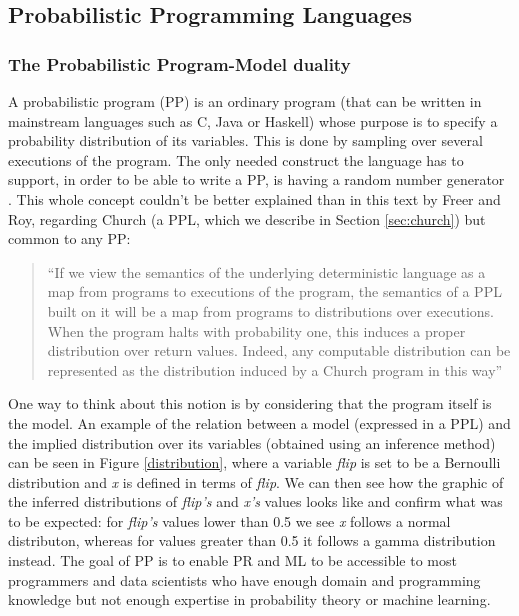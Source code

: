 \begin{itemsize}
\subsection{Probabilistic Programming Languages}
\label{sec:pp}

\subsubsection{The Probabilistic Program-Model duality}

A probabilistic program (PP) is an ordinary program (that can be written in
mainstream languages such as C, Java or Haskell) whose purpose is to specify
a probability distribution of its variables. This is done by sampling over
several executions of the program. The only needed construct the language
has to support, in order to be able to write a PP, is having a random number
generator \cite{intpp}. This whole concept couldn't be better explained than in this text by Freer and
Roy, regarding Church (a PPL, which we describe in Section \ref{sec:church})
but common to any PP:

\begin{quote}
  ``If we view the semantics of the underlying deterministic language as a map
  from programs to executions of the program, the semantics of a PPL built on it
   will be a map from programs to distributions over executions. When the
   program halts with probability one, this induces a proper distribution over
   return values. Indeed, any computable distribution can be represented as the
   distribution induced by a Church program in this way''~\cite{Freer2012}
\end{quote}

One way to think about this notion is by considering that the program itself
is the model. An example of the relation between a model (expressed in a PPL)
and the implied distribution over its variables (obtained using an inference
method) can be seen in Figure \ref{distribution}, where a variable \textit{flip}
is set to be a Bernoulli distribution and \textit{x} is defined in terms of
\textit{flip}. We can then see how the graphic of the inferred distributions
of \textit{flip's} and \textit{x's} values looks like and confirm what was to
be expected: for \textit{flip's} values lower than 0.5 we see \textit{x} follows
a normal distributon, whereas for values greater than 0.5 it follows a gamma
distribution instead.
 The goal of PP is to enable PR and ML to be accessible to
most programmers and data scientists who have enough domain and programming
knowledge but not enough expertise in probability theory or machine learning.


\end{itemsize}
